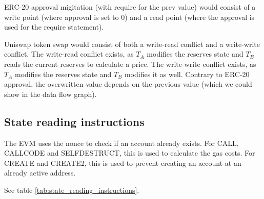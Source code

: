 \documentclass[draft,final]{vutinfth} %
\begin{document}
ERC-20 approval migitation (with require for the prev value) would consist of a write point (where approval is set to 0) and a read point (where the approval is used for the require statement).

Uniswap token swap would consist of both a write-read conflict and a write-write conflict. The write-read conflict exists, as $T_A$ modifies the reserves state and $T_B$ reads the current reserves to calculate a price. The write-write conflict exists, as $T_A$ modifies the reserves state and $T_B$ modifies it as well. Contrary to ERC-20 approval, the overwritten value depends on the previous value (which we could show in the data flow graph).

\subsection{State reading instructions}

The EVM uses the nonce to check if an account already exists. For CALL, CALLCODE and SELFDESTRUCT, this is used to calculate the gas costs. For CREATE and CREATE2, this is used to prevent creating an account at an already active address.

See table \ref{tab:state_reading_instructions}.
\end{document}
